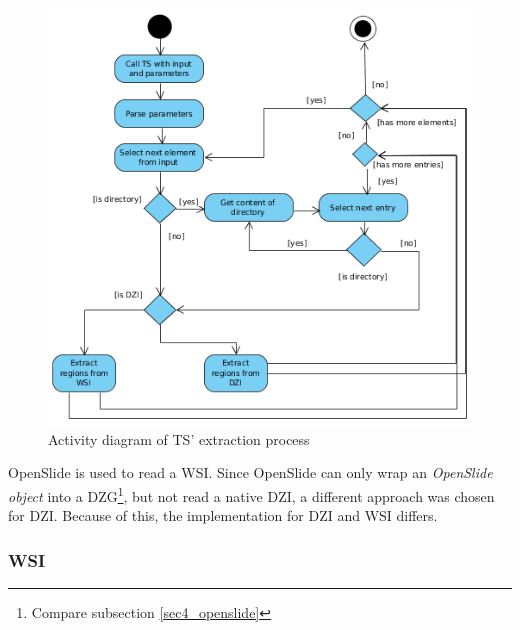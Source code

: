 \begin{figure}[H]	
	\begin{center}
		\includegraphics[scale=0.4]{img/ts_run.png}
		\caption{Activity diagram of TS' extraction process}
		\label{fig5_extractionProcess}
	\end{center}
\end{figure}

OpenSlide is used to read a WSI. Since OpenSlide can only wrap an \emph{OpenSlide object} into a DZG\footnote{
	Compare subsection \ref{sec4_openslide}
}, but not read a native DZI\cite{web:openslide}, a different approach was chosen for DZI. Because of this, the implementation for DZI and WSI differs.


\subsubsection{WSI}

